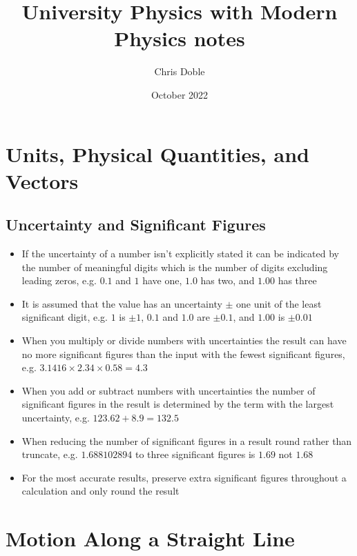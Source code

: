 \documentclass{article}
\title{University Physics with Modern Physics notes}
\author{Chris Doble}
\date{October 2022}
\begin{document}
\maketitle

\tableofcontents

\section{Units, Physical Quantities, and Vectors}

\setcounter{subsection}{4}
\subsection{Uncertainty and Significant Figures}

\begin{itemize}
    \item If the uncertainty of a number isn't explicitly stated it can be indicated by the number of meaningful digits which is the number of digits excluding leading zeros, e.g. $0.1$ and $1$ have one, $1.0$ has two, and $1.00$ has three

    \item It is assumed that the value has an uncertainty $\pm$ one unit of the least significant digit, e.g. $1$ is $\pm1$, $0.1$ and $1.0$ are $\pm0.1$, and $1.00$ is $\pm0.01$

    \item When you multiply or divide numbers with uncertainties the result can have no more significant figures than the input with the fewest significant figures, e.g. $3.1416 \times 2.34 \times 0.58 = 4.3$

    \item When you add or subtract numbers with uncertainties the number of significant figures in the result is determined by the term with the largest uncertainty, e.g. $123.62 + 8.9 = 132.5$

    \item When reducing the number of significant figures in a result round rather than truncate, e.g. $1.688102894$ to three significant figures is $1.69$ not $1.68$

    \item For the most accurate results, preserve extra significant figures throughout a calculation and only round the result
\end{itemize}

\section{Motion Along a Straight Line}
\end{document}
